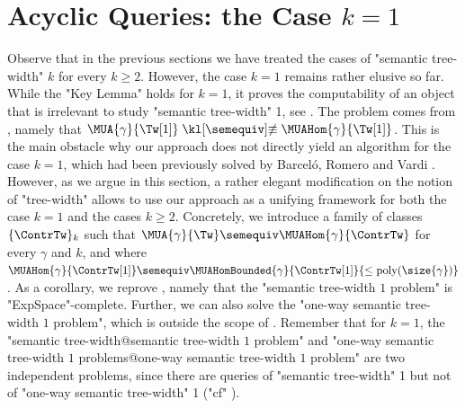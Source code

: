 \section{Acyclic Queries: the Case $k=1$}
\label{sec:acyclic-queries}

Observe that in the previous sections we have treated the cases of "semantic tree-width" $k$ for every $k\geq 2$. However, the case $k=1$ remains rather elusive so far. 
While the "Key Lemma" holds for $k=1$, it proves the computability of an object that
is irrelevant to study "semantic tree-width" 1, see . 
The problem comes from , namely that
$\MUA{\gamma}{\Tw[1]} \notsemequiv \MUAHom{\gamma}{\Tw[1]}$.
This is the main obstacle why our approach does not directly yield an algorithm for the case $k=1$, which had been previously solved by Barceló, Romero and Vardi \cite{BarceloRomeroVardi2016SemanticAcyclicity}. 
However, as we argue in this section, a rather elegant modification on the notion of "tree-width" allows to use our approach as a unifying framework for both the case $k=1$ and the cases
$k \geq 2$. 
Concretely, we introduce a family of classes $\set{\ContrTw}_k$ such that 
$\MUA{\gamma}{\Tw} \semequiv \MUAHom{\gamma}{\ContrTw}$ for every $\gamma$ and $k$, and where 
$\MUAHom{\gamma}{\ContrTw[1]} \semequiv \MUAHomBounded{\gamma}{\ContrTw[1]}{\leq\poly(\size{\gamma})}$.
As a corollary, we reprove \cite[Theorem~6.1]{BarceloRomeroVardi2016SemanticAcyclicity}, namely that the "semantic tree-width $1$ problem" is "ExpSpace"-complete. Further, we can also solve the "one-way semantic tree-width $1$ problem", which is outside the scope of \cite{BarceloRomeroVardi2016SemanticAcyclicity}. 
Remember that for $k=1$, the "semantic tree-width@semantic tree-width $1$ problem" and "one-way semantic tree-width $1$ problems@one-way semantic tree-width $1$ problem" are two independent problems, since there are queries of "semantic tree-width" 1 but not of "one-way semantic tree-width" 1 ("cf" ).



